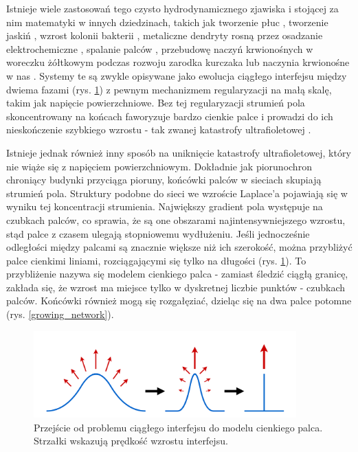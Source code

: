 \documentclass[]{pracamgr}
\begin{document}
      Istnieje wiele zastosowań tego czysto hydrodynamicznego zjawiska i stojącej za nim matematyki w innych dziedzinach, takich jak tworzenie płuc \cite{clement2012branching,lubkin1995mechanism}, tworzenie jaskiń \cite{szymczak2011initial}, wzrost kolonii bakterii \cite{matsushita1990diffusion}, metaliczne dendryty rosną przez osadzanie elektrochemiczne \cite{brady1984fractal}, spalanie palców \cite{zik1999fingering}, przebudowę naczyń krwionośnych w woreczku żółtkowym podczas rozwoju zarodka kurczaka \cite{nguyen2006dynamics} lub naczynia krwionośne w nas \cite{schneider2012tissue}. Systemy te są zwykle opisywane jako ewolucja ciągłego interfejsu między dwiema fazami (rys. \ref{continuous_to_thin}) z pewnym mechanizmem regularyzacji na małą skalę, takim jak napięcie powierzchniowe. Bez tej regularyzacji strumień pola skoncentrowany na końcach faworyzuje bardzo cienkie palce i prowadzi do ich nieskończenie szybkiego wzrostu - tak zwanej katastrofy ultrafioletowej \cite{shraiman1988singularities}.

      Istnieje jednak również inny sposób na uniknięcie katastrofy ultrafioletowej, który nie wiąże się z napięciem powierzchniowym. Dokładnie jak piorunochron chroniący budynki przyciąga pioruny, końcówki palców w sieciach skupiają strumień pola. Struktury podobne do sieci we wzroście Laplace'a pojawiają się w wyniku tej koncentracji strumienia. Największy gradient pola występuje na czubkach palców, co sprawia, że są one obszarami najintensywniejszego wzrostu, stąd palce z czasem ulegają stopniowemu wydłużeniu. Jeśli jednocześnie odległości między palcami są znacznie większe niż ich szerokość, można przybliżyć palce cienkimi liniami, rozciągającymi się tylko na długości \cite{peterson1998singular,carleson2002laplacian,gubiec2008fingered} (rys. \ref{continuous_to_thin}). To przybliżenie nazywa się modelem cienkiego palca - zamiast śledzić ciągłą granicę, zakłada się, że wzrost ma miejsce tylko w dyskretnej liczbie punktów - czubkach palców. Końcówki również mogą się rozgałęziać, dzieląc się na dwa palce potomne (rys. \ref{growing_network}).

      \begin{figure}[h]
        \centering
        \includegraphics[width=0.9\textwidth]{figs/continuous_to_thin.png}
        \caption {Przejście od problemu ciągłego interfejsu do modelu cienkiego palca. Strzałki wskazują prędkość wzrostu interfejsu.}
        \label{continuous_to_thin}
      \end{figure}
\end{document}
